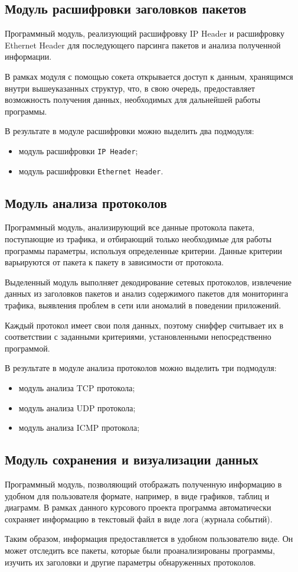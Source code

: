 \subsection{Модуль расшифровки заголовков пакетов}

Программный модуль, реализующий расшифровку IP Header и
расшифровку Ethernet Header для последующего парсинга пакетов и анализа
полученной информации.


В рамках модуля с помощью сокета открывается доступ к данным,
хранящимся внутри вышеуказанных структур, что, в свою очередь,
предоставляет возможность получения данных, необходимых для дальнейшей
работы программы.


В результате в модуле расшифровки можно выделить два подмодуля:
\begin{itemize}
    \item модуль расшифровки \texttt{IP Header};
    \item модуль расшифровки \texttt{Ethernet Header}.
\end{itemize}


\subsection{Модуль анализа протоколов}

Программный модуль, анализирующий все данные протокола пакета,
поступающие из трафика, и отбирающий только необходимые для работы
программы параметры, используя определенные критерии. Данные критерии
варьируются от пакета к пакету в зависимости от протокола.


Выделенный модуль выполняет декодирование сетевых протоколов,
извлечение данных из заголовков пакетов и анализ содержимого пакетов для
мониторинга трафика, выявления проблем в сети или аномалий в поведении
приложений.


Каждый протокол имеет свои поля данных, поэтому сниффер считывает
их в соответствии с заданными критериями, установленными непосредственно
программой.


В результате в модуле анализа протоколов можно выделить три
подмодуля:
\begin{itemize}
    \item модуль анализа TCP протокола;
    \item модуль анализа UDP протокола;
    \item модуль анализа ICMP протокола;
\end{itemize}


\subsection{Модуль сохранения и визуализации данных}

Программный модуль, позволяющий отображать полученную
информацию в удобном для пользователя формате, например, в виде графиков,
таблиц и диаграмм. В рамках данного курсового проекта программа
автоматически сохраняет информацию в текстовый файл в виде лога 
(журнала событий).


Таким образом, информация предоставляется в удобном пользователю
виде. Он может отследить все пакеты, которые были проанализированы
программы, изучить их заголовки и другие параметры обнаруженных
протоколов.
